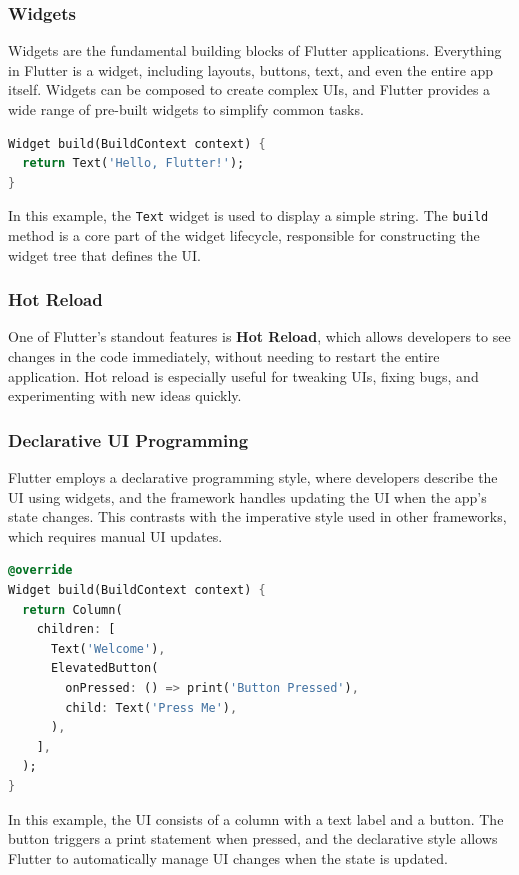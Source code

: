 \documentclass[12pt,a4paper]{report}
\begin{document}
\subsubsection{Widgets}
Widgets are the fundamental building blocks of Flutter applications. Everything in Flutter is a widget, including layouts, buttons, text, and even the entire app itself. Widgets can be composed to create complex UIs, and Flutter provides a wide range of pre-built widgets to simplify common tasks.

\begin{lstlisting}[language=Dart, caption={Simple Flutter Widget}]
Widget build(BuildContext context) {
  return Text('Hello, Flutter!');
}
\end{lstlisting}

In this example, the \texttt{Text} widget is used to display a simple string. The \texttt{build} method is a core part of the widget lifecycle, responsible for constructing the widget tree that defines the UI.

\subsubsection{Hot Reload}
One of Flutter's standout features is \textbf{Hot Reload}, which allows developers to see changes in the code immediately, without needing to restart the entire application. Hot reload is especially useful for tweaking UIs, fixing bugs, and experimenting with new ideas quickly.

\subsubsection{Declarative UI Programming}
Flutter employs a declarative programming style, where developers describe the UI using widgets, and the framework handles updating the UI when the app's state changes. This contrasts with the imperative style used in other frameworks, which requires manual UI updates.

\begin{lstlisting}[language=Dart, caption={Declarative UI Example}]
@override
Widget build(BuildContext context) {
  return Column(
    children: [
      Text('Welcome'),
      ElevatedButton(
        onPressed: () => print('Button Pressed'),
        child: Text('Press Me'),
      ),
    ],
  );
}
\end{lstlisting}

In this example, the UI consists of a column with a text label and a button. The button triggers a print statement when pressed, and the declarative style allows Flutter to automatically manage UI changes when the state is updated.
\end{document}
